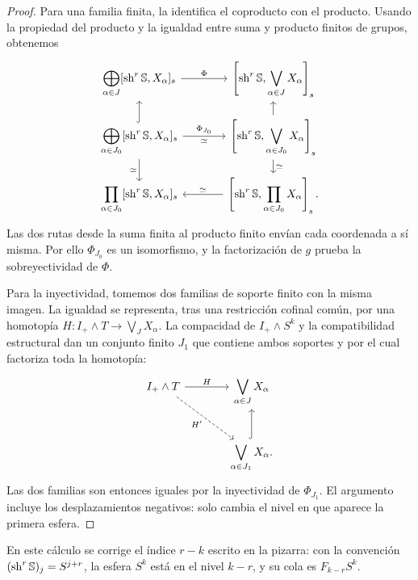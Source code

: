 \begin{proof}
Para una familia finita, la  identifica el coproducto con el producto. Usando la propiedad del producto y la igualdad entre suma y producto finitos de grupos, obtenemos
\[
\begin{tikzcd}[column sep=large,row sep=1.25em]
\displaystyle\bigoplus_{\alpha\in J}[\sh^r\mathbb S,X_\alpha]_s
\arrow[r,"\Phi"]
&\displaystyle\left[\sh^r\mathbb S,\bigvee_{\alpha\in J}X_\alpha\right]_s\\
\displaystyle\bigoplus_{\alpha\in J_0}[\sh^r\mathbb S,X_\alpha]_s
\arrow[u,hook]\arrow[r,"\Phi_{J_0}","\simeq"']\arrow[d,"\simeq"']
&\displaystyle\left[\sh^r\mathbb S,\bigvee_{\alpha\in J_0}X_\alpha\right]_s\arrow[u]\arrow[d,"\simeq"]\\
\displaystyle\prod_{\alpha\in J_0}[\sh^r\mathbb S,X_\alpha]_s
&\displaystyle\left[\sh^r\mathbb S,\prod_{\alpha\in J_0}X_\alpha\right]_s\arrow[l,"\simeq"'].
\end{tikzcd}
\]
Las dos rutas desde la suma finita al producto finito envían cada coordenada a sí misma. Por ello $\Phi_{J_0}$ es un isomorfismo, y la factorización de $g$ prueba la sobreyectividad de $\Phi$.

Para la inyectividad, tomemos dos familias de soporte finito con la misma imagen. La igualdad se representa, tras una restricción cofinal común, por una homotopía $H\colon I_+\wedge T\to\bigvee_JX_\alpha$. La compacidad de $I_+\wedge S^k$ y la compatibilidad estructural dan un conjunto finito $J_1$ que contiene ambos soportes y por el cual factoriza toda la homotopía:
\[
\begin{tikzcd}[column sep=large,row sep=large]
I_+\wedge T\arrow[r,"H"]\arrow[dr,dashed,"H'"']
&\displaystyle\bigvee_{\alpha\in J}X_\alpha\\
&\displaystyle\bigvee_{\alpha\in J_1}X_\alpha\arrow[u,hook].
\end{tikzcd}
\]
Las dos familias son entonces iguales por la inyectividad de $\Phi_{J_1}$. El argumento incluye los desplazamientos negativos: solo cambia el nivel en que aparece la primera esfera.
\end{proof}

\begin{nota}
En este cálculo se corrige el índice $r-k$ escrito en la pizarra: con la convención $(\operatorname{sh}^r\mathbb S)_j=S^{j+r}$, la esfera $S^k$ está en el nivel $k-r$, y su cola es $F_{k-r}S^k$.
\end{nota}

